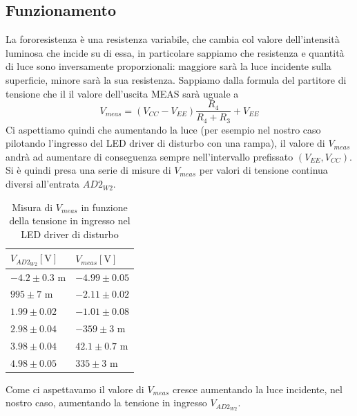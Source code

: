 \documentclass[10pt, a4paper, italian]{article}
\begin{document}
\subsection{Funzionamento}
La fororesistenza è una resistenza variabile, che cambia col valore dell'intensità luminosa che incide su di essa, in particolare sappiamo che resistenza e quantità di luce sono inversamente proporzionali: maggiore sarà la luce incidente sulla superficie, minore sarà la sua resistenza.
Sappiamo dalla formula del partitore di tensione che il il valore dell'uscita MEAS sarà uguale a
\begin{equation}
V_{meas}=(V_{CC}- V_{EE})\frac{R_4}{R_4 + R_3}  + V_{EE}
\end{equation}
Ci aspettiamo quindi che aumentando la luce (per esempio nel nostro caso pilotando l'ingresso del LED driver di disturbo con una rampa), il valore di $V_{meas}$ andrà ad aumentare di conseguenza sempre nell'intervallo prefissato $(V_{EE},V_{CC})$.
Si è quindi presa una serie di misure di $V_{meas}$ per valori di tensione continua diversi all'entrata $AD2_{W2}$.
\begin{table}[H]
\centering
\begin{tabular}{@{}ll@{}}
\toprule
$V_{AD2_{W2}} [\si{\V}]$ & $V_{meas} [\si{\V}]$\\
\midrule
$-4.2 \pm 0.3$ m 	& $ -4.99 \pm 0.05$	\\
$995 \pm 7$ m 	& $ -2.11 \pm 0.02 $	\\
$1.99 \pm 0.02$ 	& $ -1.01 \pm 0.08 $\\
$2.98 \pm 0.04$ 	& $ -359 \pm 3 $ m\\
$3.98 \pm 0.04$ 	& $ 42.1 \pm 0.7 $ m\\
$4.98 \pm 0.05$ 	& $ 335 \pm 3$ m\\

\bottomrule
\end{tabular}
\caption{Misura di $V_{meas}$ in funzione della tensione in ingresso nel LED driver di disturbo}
\end{table}
Come ci aspettavamo il valore di $V_{meas}$ cresce aumentando la luce incidente, nel nostro caso, aumentando la tensione in ingresso $V_{AD2_{W2}}$.
\end{document}
